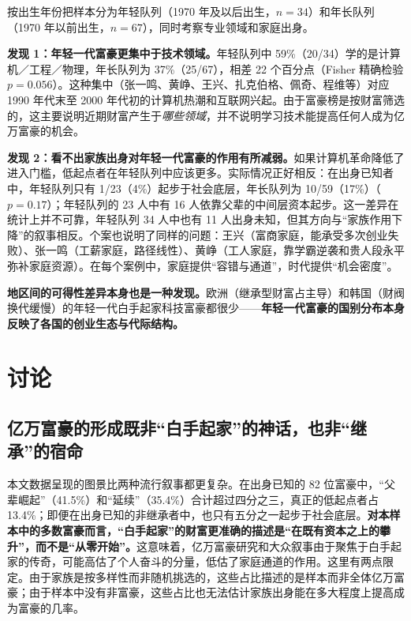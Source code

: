 \documentclass[UTF8,a4paper,11pt]{ctexart}
\begin{document}
按出生年份把样本分为年轻队列（1970 年及以后出生，$n=34$）和年长队列（1970 年以前出生，$n=67$），同时考察专业领域和家庭出身。

\textbf{发现 1：年轻一代富豪更集中于技术领域。}年轻队列中 59\%（20/34）学的是计算机／工程／物理，年长队列为 37\%（25/67），相差 22 个百分点（Fisher 精确检验 $p=0.056$）。这种集中（张一鸣、黄峥、王兴、扎克伯格、佩奇、程维等）对应 1990 年代末至 2000 年代初的计算机热潮和互联网兴起。由于富豪榜是按财富筛选的，这主要说明近期财富产生于\emph{哪些领域}，并不说明学习技术能提高任何人成为亿万富豪的机会。

\textbf{发现 2：看不出家族出身对年轻一代富豪的作用有所减弱。}如果计算机革命降低了进入门槛，低起点者在年轻队列中应该更多。实际情况正好相反：在出身已知者中，年轻队列只有 1/23（4\%）起步于社会底层，年长队列为 10/59（17\%）（$p=0.17$）；年轻队列的 23 人中有 16 人依靠父辈的中间层资本起步。这一差异在统计上并不可靠，年轻队列 34 人中也有 11 人出身未知，但其方向与“家族作用下降”的叙事相反。个案也说明了同样的问题：王兴（富商家庭，能承受多次创业失败）、张一鸣（工薪家庭，路径线性）、黄峥（工人家庭，靠学霸逆袭和贵人段永平弥补家庭资源）。在每个案例中，家庭提供“容错与通道”，时代提供“机会密度”。

\textbf{地区间的可得性差异本身也是一种发现。}欧洲（继承型财富占主导）和韩国（财阀换代缓慢）的年轻一代白手起家科技富豪都很少——\textbf{年轻一代富豪的国别分布本身反映了各国的创业生态与代际结构。}

\section{讨论}
\label{sec:discussion}

\subsection{亿万富豪的形成既非“白手起家”的神话，也非“继承”的宿命}

本文数据呈现的图景比两种流行叙事都更复杂。在出身已知的 82 位富豪中，“父辈崛起”（41.5\%）和“延续”（35.4\%）合计超过四分之三，真正的低起点者占 13.4\%；即便在出身已知的非继承者中，也只有五分之一起步于社会底层。\textbf{对本样本中的多数富豪而言，“白手起家”的财富更准确的描述是“在既有资本之上的攀升”，而不是“从零开始”。}这意味着，亿万富豪研究和大众叙事由于聚焦于白手起家的传奇，可能高估了个人奋斗的分量，低估了家庭通道的作用。这里有两点限定。由于家族是按多样性而非随机挑选的，这些占比描述的是样本而非全体亿万富豪；由于样本中没有非富豪，这些占比也无法估计家族出身能在多大程度上提高成为富豪的几率。
\end{document}
